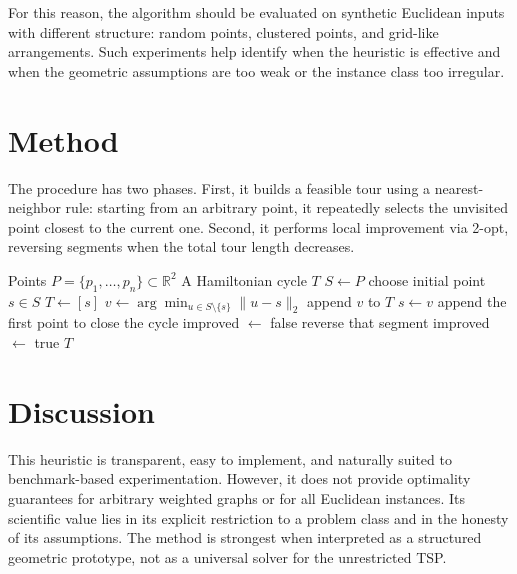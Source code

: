 \documentclass[11pt]{article}
\begin{document}
For this reason, the algorithm should be evaluated on synthetic Euclidean inputs with different structure: random points, clustered points, and grid-like arrangements. Such experiments help identify when the heuristic is effective and when the geometric assumptions are too weak or the instance class too irregular.

\section{Method}

The procedure has two phases. First, it builds a feasible tour using a nearest-neighbor rule: starting from an arbitrary point, it repeatedly selects the unvisited point closest to the current one. Second, it performs local improvement via 2-opt, reversing segments when the total tour length decreases.

\begin{algorithm}[H]
\caption{Restricted Euclidean TSP heuristic}
\begin{algorithmic}[1]
\Require Points $P = \{p_1, \dots, p_n\} \subset \mathbb{R}^2$
\Ensure A Hamiltonian cycle $T$
\State $S \gets P$
\State choose initial point $s \in S$
\State $T \gets [s]$
    \State $v \gets \arg\min_{u \in S \setminus \{s\}} \|u-s\|_2$
    \State append $v$ to $T$
    \State $s \gets v$
\EndWhile
\State append the first point to close the cycle
\Repeat
    \State improved $\gets$ false
            \State reverse that segment
            \State improved $\gets$ true
        \EndIf
    \EndFor
{}
\State \Return $T$
\end{algorithmic}
\end{algorithm}

\section{Discussion}

This heuristic is transparent, easy to implement, and naturally suited to benchmark-based experimentation. However, it does not provide optimality guarantees for arbitrary weighted graphs or for all Euclidean instances. Its scientific value lies in its explicit restriction to a problem class and in the honesty of its assumptions. The method is strongest when interpreted as a structured geometric prototype, not as a universal solver for the unrestricted TSP.
\end{document}
